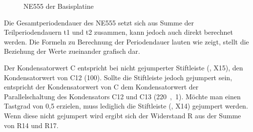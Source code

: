 \begin{figure}[htb]
    \centering
    \qquad
    \qquad
    \caption[NE555 der Basisplatine]{NE555 der \gls{Basisplatine}}
    \label{fig:basisplatine-ne555}
\end{figure}

Die Gesamtperiodendauer des NE555 setzt sich aus Summe der Teilperiodendauern t1 und t2 zusammen, kann jedoch auch direkt berechnet werden. Die Formeln zu Berechnung der Periodendauer lauten wie  zeigt,  stellt die Beziehung der Werte zueinander grafisch dar.



Der Kondensatorwert C entspricht bei nicht gejumperter Stiftleiste (, X15), den Kondensatorwert von C12 (\unit{100}{\nano\farad}). Sollte die Stiftleiste jedoch gejumpert sein, entspricht der Kondensatorwert von C dem Kondensatorwert der Parallelschaltung des Kondensators C12 und C13 (\unit{220,1}{\micro\farad}). Möchte man einen Tastgrad von 0,5 erzielen, muss lediglich die Stiftleiste (, X14) gejumpert werden. Wenn diese nicht gejumpert wird ergibt sich der Widerstand R aus der Summe von R14 und R17.

